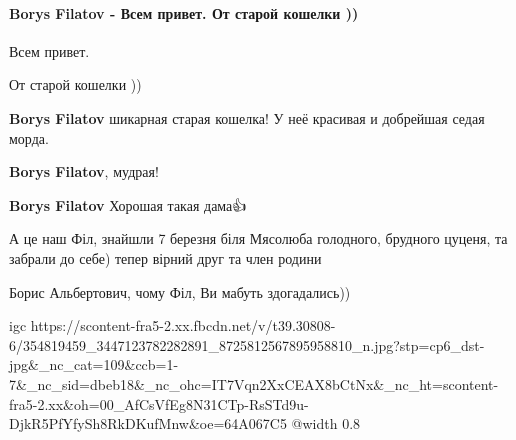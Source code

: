  
 
 
 
 

\paragraph{Borys Filatov - Всем привет. От старой кошелки ))}


Всем привет.

От старой кошелки ))

\begin{itemize} %
\textbf{Borys Filatov} шикарная старая кошелка! У неё красивая и добрейшая седая морда.

\textbf{Borys Filatov}, мудрая!

\textbf{Borys Filatov} Хорошая такая дама👍

\end{itemize} %


А це наш Філ, знайшли 7 березня біля Мясолюба голодного, брудного цуценя, та
забрали до себе) тепер вірний друг та член родини 🐶

Борис Альбертович, чому Філ, Ви мабуть здогадались)) 🎂

\ifcmt
  igc https://scontent-fra5-2.xx.fbcdn.net/v/t39.30808-6/354819459_3447123782282891_8725812567895958810_n.jpg?stp=cp6_dst-jpg&_nc_cat=109&ccb=1-7&_nc_sid=dbeb18&_nc_ohc=IT7Vqn2XxCEAX8bCtNx&_nc_ht=scontent-fra5-2.xx&oh=00_AfCsVfEg8N31CTp-RsSTd9u-DjkR5PfYfySh8RkDKufMnw&oe=64A067C5
	@width 0.8
\fi

